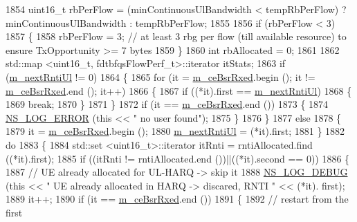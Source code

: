 \begin{DoxyCode}
1854   uint16\_t rbPerFlow = (minContinuousUlBandwidth < tempRbPerFlow) ? minContinuousUlBandwidth : 
      tempRbPerFlow;
1855 
1856   \textcolor{keywordflow}{if} (rbPerFlow < 3)
1857     \{
1858       rbPerFlow = 3;  \textcolor{comment}{// at least 3 rbg per flow (till available resource) to ensure TxOpportunity >= 7
       bytes}
1859     \}
1860   \textcolor{keywordtype}{int} rbAllocated = 0;
1861 
1862   std::map <uint16\_t, fdtbfqsFlowPerf\_t>::iterator itStats;
1863   \textcolor{keywordflow}{if} (\hyperlink{classns3_1_1FdTbfqFfMacScheduler_adcaedd73d9597af47782db5e9f605544}{m\_nextRntiUl} != 0)
1864     \{
1865       \textcolor{keywordflow}{for} (it = \hyperlink{classns3_1_1FdTbfqFfMacScheduler_a4affe9fe434a4cb87f5875ddf1766d61}{m\_ceBsrRxed}.begin (); it != \hyperlink{classns3_1_1FdTbfqFfMacScheduler_a4affe9fe434a4cb87f5875ddf1766d61}{m\_ceBsrRxed}.end (); it++)
1866         \{
1867           \textcolor{keywordflow}{if} ((*it).first == \hyperlink{classns3_1_1FdTbfqFfMacScheduler_adcaedd73d9597af47782db5e9f605544}{m\_nextRntiUl})
1868             \{
1869               \textcolor{keywordflow}{break};
1870             \}
1871         \}
1872       \textcolor{keywordflow}{if} (it == \hyperlink{classns3_1_1FdTbfqFfMacScheduler_a4affe9fe434a4cb87f5875ddf1766d61}{m\_ceBsrRxed}.end ())
1873         \{
1874           \hyperlink{group__logging_ga0261a8db1d4ac5f79417d117634fd455}{NS\_LOG\_ERROR} (\textcolor{keyword}{this} << \textcolor{stringliteral}{" no user found"});
1875         \}
1876     \}
1877   \textcolor{keywordflow}{else}
1878     \{
1879       it = \hyperlink{classns3_1_1FdTbfqFfMacScheduler_a4affe9fe434a4cb87f5875ddf1766d61}{m\_ceBsrRxed}.begin ();
1880       \hyperlink{classns3_1_1FdTbfqFfMacScheduler_adcaedd73d9597af47782db5e9f605544}{m\_nextRntiUl} = (*it).first;
1881     \}
1882   \textcolor{keywordflow}{do}
1883     \{
1884       std::set <uint16\_t>::iterator itRnti = rntiAllocated.find ((*it).first);
1885       \textcolor{keywordflow}{if} ((itRnti != rntiAllocated.end ())||((*it).second == 0))
1886         \{
1887           \textcolor{comment}{// UE already allocated for UL-HARQ -> skip it}
1888           \hyperlink{group__logging_ga413f1886406d49f59a6a0a89b77b4d0a}{NS\_LOG\_DEBUG} (\textcolor{keyword}{this} << \textcolor{stringliteral}{" UE already allocated in HARQ -> discared, RNTI "} << (*it).
      first);
1889           it++;
1890           \textcolor{keywordflow}{if} (it == \hyperlink{classns3_1_1FdTbfqFfMacScheduler_a4affe9fe434a4cb87f5875ddf1766d61}{m\_ceBsrRxed}.end ())
1891             \{
1892               \textcolor{comment}{// restart from the first}

\end{DoxyCode}
